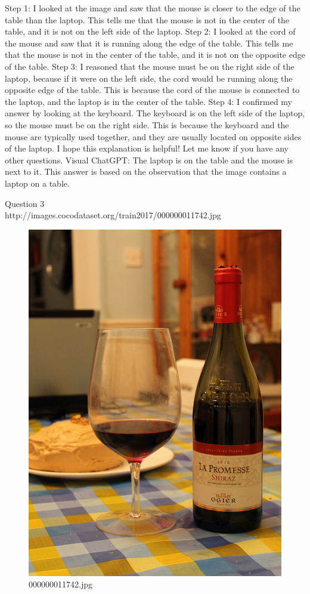 \begin{enumerate}
        Step 1: I looked at the image and saw that the mouse is closer to the edge of the table than the laptop. This tells me that the mouse is not in the center of the table, and it is not on the left side of the laptop.
        Step 2: I looked at the cord of the mouse and saw that it is running along the edge of the table. This tells me that the mouse is not in the center of the table, and it is not on the opposite edge of the table.
        Step 3: I reasoned that the mouse must be on the right side of the laptop, because if it were on the left side, the cord would be running along the opposite edge of the table. This is because the cord of the mouse is connected to the laptop, and the laptop is in the center of the table.
        Step 4: I confirmed my answer by looking at the keyboard. The keyboard is on the left side of the laptop, so the mouse must be on the right side. This is because the keyboard and the mouse are typically used together, and they are usually located on opposite sides of the laptop.
        I hope this explanation is helpful! Let me know if you have any other questions.
        \subitem Visual ChatGPT: The laptop is on the table and the mouse is next to it. This answer is based on the observation that the image contains a laptop on a table.
    \end{enumerate}
Question 3\\
http://images.cocodataset.org/train2017/000000011742.jpg
    \begin{figure}[h]
        \centering
        \includegraphics[width=0.8\linewidth]{../image set/easy/000000011742.jpg}
        \caption{000000011742.jpg}
    \end{figure}
